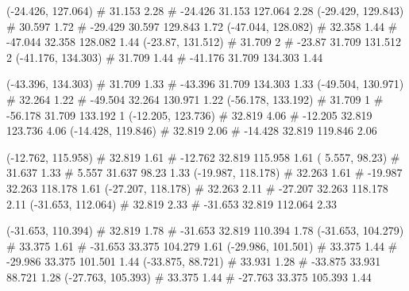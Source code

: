 \documentclass[a4paper,openbib,10pt]{article}
\newenvironment{treegraph}{\begin{graph}}{\end{graph}}
\begin{document}
\begin{treegraph}
  (-24.426, 127.064) #     31.153    2.28
   #    -24.426    31.153    127.064    2.28
  (-29.429, 129.843) #     30.597    1.72
   #    -29.429    30.597    129.843    1.72
  (-47.044, 128.082) #     32.358    1.44
   #    -47.044    32.358    128.082    1.44
  (-23.87, 131.512) #     31.709    2
   #    -23.87    31.709    131.512    2
  (-41.176, 134.303) #     31.709    1.44
   #    -41.176    31.709    134.303    1.44

  (-43.396, 134.303) #     31.709    1.33
   #    -43.396    31.709    134.303    1.33
  (-49.504, 130.971) #     32.264    1.22
   #    -49.504    32.264    130.971    1.22
  (-56.178, 133.192) #     31.709    1
   #    -56.178    31.709    133.192    1
  (-12.205, 123.736) #     32.819    4.06
   #    -12.205    32.819    123.736    4.06
  (-14.428, 119.846) #     32.819    2.06
   #    -14.428    32.819    119.846    2.06

  (-12.762, 115.958) #     32.819    1.61
   #    -12.762    32.819    115.958    1.61
  ( 5.557, 98.23) #     31.637    1.33
   #    5.557    31.637    98.23    1.33
  (-19.987, 118.178) #     32.263    1.61
   #    -19.987    32.263    118.178    1.61
  (-27.207, 118.178) #     32.263    2.11
   #    -27.207    32.263    118.178    2.11
  (-31.653, 112.064) #     32.819    2.33
   #    -31.653    32.819    112.064    2.33

  (-31.653, 110.394) #     32.819    1.78
   #    -31.653    32.819    110.394    1.78
  (-31.653, 104.279) #     33.375    1.61
   #    -31.653    33.375    104.279    1.61
  (-29.986, 101.501) #     33.375    1.44
   #    -29.986    33.375    101.501    1.44
  (-33.875, 88.721) #     33.931    1.28
   #    -33.875    33.931    88.721    1.28
  (-27.763, 105.393) #     33.375    1.44
   #    -27.763    33.375    105.393    1.44


\end{treegraph}
\end{document}
